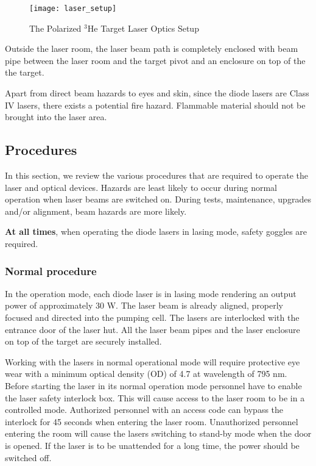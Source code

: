 {\begin{figure}
  \centerline{\texttt{[image: laser\_setup]}}
  \caption[Polarized $^3$He Laser Optics Setup]{The Polarized $^3$He Target 
Laser Optics Setup}
   \label{fig:optics_setup} 
\end{figure}


Outside the laser room, the laser beam path is completely enclosed with beam 
pipe between the laser room and the target pivot and an enclosure on top of the 
the target. 

Apart from direct beam hazards to eyes and skin, since the diode lasers are 
Class IV lasers, there exists a potential fire hazard. Flammable material 
should not be brought into the laser area.  

\subsection{Procedures}

In this section, we review the various procedures that are required to operate the
laser and optical devices. Hazards are least likely to occur during normal operation
when laser beams are switched on. During tests, maintenance,
upgrades and/or alignment,  beam hazards are more likely.

{\bf At all times}, when operating the diode lasers in lasing mode, safety goggles
are required.

\subsubsection{Normal procedure}
In the operation mode, each diode laser is in lasing mode rendering an output 
power of approximately 30 W. The laser beam is already aligned, properly 
focused and directed into the pumping cell. The lasers are interlocked with the
entrance door of the laser hut. All the laser beam pipes and the laser 
enclosure on top of the target are securely installed.

Working with the lasers in normal operational mode will require protective 
eye wear with a minimum optical 
density (OD) of 4.7 at wavelength of 795 nm. Before
starting the laser in its normal operation mode personnel have to enable the
laser safety interlock box. This will cause access to the laser room to be in 
a controlled mode. Authorized personnel with an access code can 
bypass the interlock for 45 seconds when entering the laser room. Unauthorized
personnel entering the room will cause the lasers switching to stand-by mode
when the door is opened. If the laser is to be unattended for a long time, the 
power should be switched off.

}
